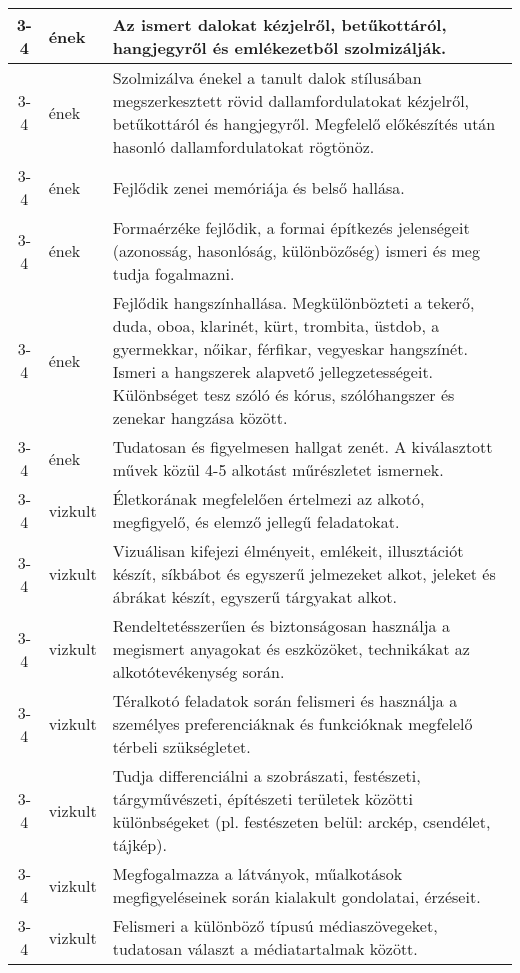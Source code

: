 \begin{small}
\begin{longtable}{c | p{2cm} |  p{11cm} }
              3-4 & ének & Az ismert dalokat kézjelről, betűkottáról, hangjegyről és emlékezetből szolmizálják. \\ \hline
              3-4 & ének & Szolmizálva énekel a tanult dalok stílusában megszerkesztett rövid dallamfordulatokat kézjelről, betűkottáról és hangjegyről. Megfelelő előkészítés után hasonló dallamfordulatokat rögtönöz. \\ \hline
              3-4 & ének & Fejlődik zenei memóriája és belső hallása. \\ \hline
              3-4 & ének & Formaérzéke fejlődik, a formai építkezés jelenségeit (azonosság, hasonlóság, különbözőség) ismeri és meg tudja fogalmazni. \\ \hline
              3-4 & ének & Fejlődik hangszínhallása. Megkülönbözteti a tekerő, duda, oboa, klarinét, kürt, trombita, üstdob, a gyermekkar, nőikar, férfikar, vegyeskar hangszínét. Ismeri a hangszerek alapvető jellegzetességeit. Különbséget tesz szóló és kórus, szólóhangszer és zenekar hangzása között. \\ \hline
              3-4 & ének & Tudatosan és figyelmesen hallgat zenét. A kiválasztott művek közül 4-5 alkotást műrészletet ismernek. \\ \hline
              3-4 & vizkult & Életkorának megfelelően értelmezi az alkotó, megfigyelő, és elemző jellegű feladatokat. \\ \hline
              3-4 & vizkult & Vizuálisan kifejezi élményeit, emlékeit, illusztációt készít, síkbábot és egyszerű jelmezeket alkot, jeleket és ábrákat készít, egyszerű tárgyakat alkot. \\ \hline
              3-4 & vizkult & Rendeltetésszerűen és biztonságosan használja a megismert anyagokat és eszközöket, technikákat az alkotótevékenység során. \\ \hline
              3-4 & vizkult & Téralkotó feladatok során felismeri és használja a személyes preferenciáknak és funkcióknak megfelelő térbeli szükségletet. \\ \hline
              3-4 & vizkult & Tudja  differenciálni a szobrászati, festészeti, tárgyművészeti, építészeti területek közötti különbségeket (pl. festészeten belül: arckép, csendélet, tájkép). \\ \hline
              3-4 & vizkult & Megfogalmazza a látványok, műalkotások megfigyeléseinek során kialakult gondolatai, érzéseit. \\ \hline
              3-4 & vizkult & Felismeri a különböző típusú médiaszövegeket, tudatosan választ a médiatartalmak között. \\ \hline

\end{longtable}
\end{small}
